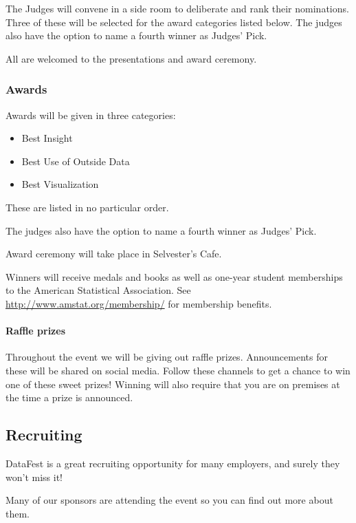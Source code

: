 \documentclass[]{article}
\providecommand{\tightlist}{%
  \setlength{\itemsep}{0pt}\setlength{\parskip}{0pt}}
\let\oldparagraph\paragraph
\renewcommand{\paragraph}[1]{\oldparagraph{#1}\mbox{}}
\begin{document}
The Judges will convene in a side room to deliberate and rank their
nominations. Three of these will be selected for the award categories
listed below. The judges also have the option to name a fourth winner as
Judges' Pick.

All are welcomed to the presentations and award ceremony.

\hypertarget{awards}{%
\subsubsection{Awards}\label{awards}}

Awards will be given in three categories:

\begin{itemize}
\tightlist
\item
  Best Insight
\item
  Best Use of Outside Data
\item
  Best Visualization
\end{itemize}

These are listed in no particular order.

The judges also have the option to name a fourth winner as Judges' Pick.

Award ceremony will take place in Selvester's Cafe.

Winners will receive medals and books as well as one-year student
memberships to the American Statistical Association. See
\url{http://www.amstat.org/membership/} for membership benefits.

\hypertarget{raffle-prizes}{%
\paragraph{Raffle prizes}\label{raffle-prizes}}

Throughout the event we will be giving out raffle prizes. Announcements
for these will be shared on social media. Follow these channels to get a
chance to win one of these sweet prizes! Winning will also require that
you are on premises at the time a prize is announced.

\hypertarget{recruiting}{%
\subsection{Recruiting}\label{recruiting}}

DataFest is a great recruiting opportunity for many employers, and
surely they won't miss it!

Many of our sponsors are attending the event so you can find out more
about them.
\end{document}
